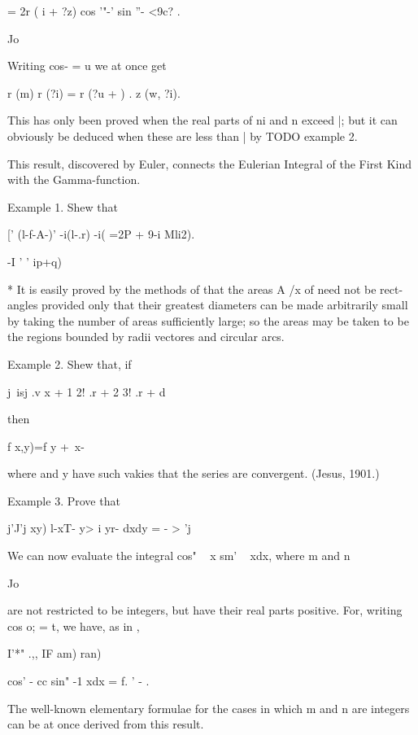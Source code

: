 = 2r ( i + ?z) cos '"-' sin ''- <9c? .

Jo

Writing cos- = u we at once get

r (m) r (?i) = r (?u + ) . z (w, ?i).

This has only been proved when the real parts of ni and n exceed |;
but it can obviously be deduced when these are less than | by TODO
example 2.

This result, discovered by Euler, connects the Eulerian Integral of
the First Kind with the Gamma-function.

Example 1. Shew that

[' (l-f-A-)' -i(l-.r) -i( =2P + 9-i Mli2).

  -I ' ' ip+q)

  * It is easily proved by the methods of  that the areas A /x of
   need not be rect- angles provided only that their greatest
diameters can be made arbitrarily small by taking the number of areas
sufficiently large; so the areas may be taken to be the regions
bounded by radii vectores and circular arcs.

%
%

Example 2. Shew that, if

j\ isj .v x + 1 2! .r + 2 3! .r + d

then

f x,y)=f y + \,x-\ \

where and y have such vakies that the series are convergent. (Jesus,
1901.)

Example 3. Prove that

j'J'j xy) l-xT- y> i yr- dxdy = - > 'j



We can now evaluate the integral cos" ~ x sm' ~ xdx, where m and n

Jo

are not restricted to be integers, but have their real parts positive.
For, writing cos o; = t, we have, as in ,

I'*" .,, IF am) ran)

cos' - cc sin" -1 xdx = f. ' - .

The well-known elementary formulae for the cases in which m and n are
integers can be at once derived from this result.

